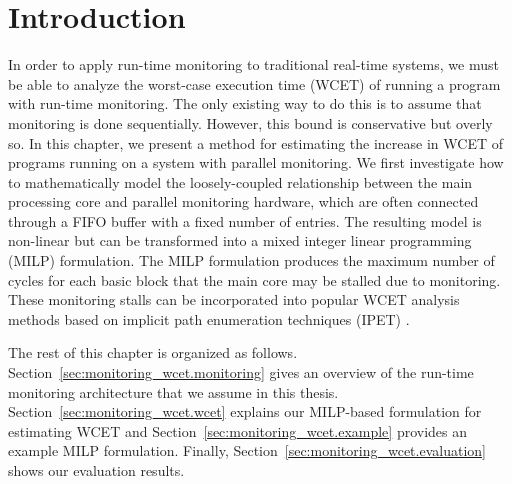 \section{Introduction}
\label{sec:monitoring_wcet.introduction}

In order to apply run-time monitoring to traditional real-time systems, we must
be able to analyze the worst-case execution time (WCET) of running a program
with run-time monitoring. The only existing way to do this is to assume that
monitoring is done sequentially. However, this bound is conservative but overly so.
In this chapter, we present a method for estimating the increase in WCET of
programs running on a system with parallel monitoring. We first investigate how
to mathematically model the loosely-coupled relationship between the main 
processing core and parallel monitoring hardware, which are often connected
through a FIFO buffer with a fixed number of entries. The resulting model
is non-linear but can be transformed into a mixed integer linear programming (MILP) 
formulation.
The MILP formulation produces the maximum number of cycles for each basic block
that the main core may be stalled due to monitoring.
These monitoring stalls can be incorporated into popular
WCET analysis methods based on implicit path enumeration techniques (IPET)
\cite{li-ipet-dac95}.

The rest of this chapter is organized as follows.
Section~\ref{sec:monitoring_wcet.monitoring} gives an overview of the run-time
monitoring architecture that we assume in this thesis.
Section~\ref{sec:monitoring_wcet.wcet} explains our MILP-based formulation for
estimating WCET and Section~\ref{sec:monitoring_wcet.example} provides an
example MILP formulation. Finally, Section~\ref{sec:monitoring_wcet.evaluation}
shows our evaluation results.


